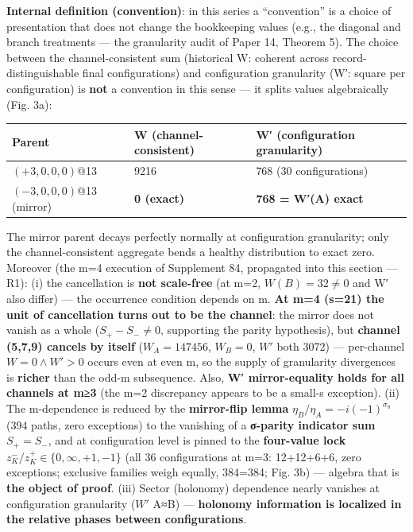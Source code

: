 \documentclass[
]{ltjsarticle}
\newcounter{none} %
\begin{document}
\textbf{Internal definition (convention)}: in this series a
``convention'' is a choice of presentation that does not change the
bookkeeping values (e.g., the diagonal and branch treatments --- the
granularity audit of Paper 14, Theorem 5). The choice between the
channel-consistent sum (historical W: coherent across
record-distinguishable final configurations) and configuration
granularity (W′: square per configuration) is \textbf{not} a convention
in this sense --- it splits values algebraically (Fig. 3a):

{\def\LTcaptype{none} %
\begin{longtable}[]{@{}lll@{}}
\toprule\noalign{}
Parent & W (channel-consistent) & W′ (configuration granularity) \\
\midrule\noalign{}
\endhead
\bottomrule\noalign{}
\endlastfoot
\((+3,0,0,0)\)@13 & 9216 & 768 (30 configurations) \\
\((-3,0,0,0)\)@13 (mirror) & \textbf{0 (exact)} & \textbf{768 = W′(A)
exact} \\
\end{longtable}
}

The mirror parent decays perfectly normally at configuration
granularity; only the channel-consistent aggregate bends a healthy
distribution to exact zero. Moreover (the m=4 execution of Supplement
84, propagated into this section --- R1): (i) the cancellation is
\textbf{not scale-free} (at m=2, \(W(B)=32\neq0\) and W′ also differ)
--- the occurrence condition depends on m. \textbf{At m=4 (s=21) the
unit of cancellation turns out to be the channel}: the mirror does not
vanish as a whole (\(S_+-S_-\neq0\), supporting the parity hypothesis),
but \textbf{channel (5,7,9) cancels by itself} (\(W_A=147456\),
\(W_B=0\), \(W'\) both 3072) --- per-channel \(W=0\wedge W'>0\) occurs
even at even m, so the supply of granularity divergences is
\textbf{richer} than the odd-m subsequence. Also, \textbf{W′
mirror-equality holds for all channels at m≥3} (the m=2 discrepancy
appears to be a small-s exception). (ii) The m-dependence is reduced by
the \textbf{mirror-flip lemma} \(\eta_B/\eta_A=-i(-1)^{\sigma_0}\) (394
paths, zero exceptions) to the vanishing of a \textbf{σ-parity indicator
sum} \(S_+=S_-\), and at configuration level is pinned to the
\textbf{four-value lock} \(z^-_K/z^+_K\in\{0,\infty,+1,-1\}\) (all 36
configurations at m=3: 12+12+6+6, zero exceptions; exclusive families
weigh equally, 384=384; Fig. 3b) --- algebra that is \textbf{the object
of proof}. (iii) Sector (holonomy) dependence nearly vanishes at
configuration granularity (\(W'\) A≈B) --- \textbf{holonomy information
is localized in the relative phases between configurations}.
\end{document}
